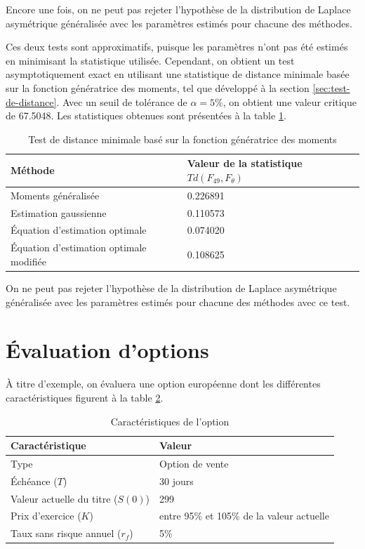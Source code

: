 Encore une fois, on ne peut pas rejeter l'hypothèse de la distribution
de Laplace asymétrique généralisée avec les paramètres estimés pour
chacune des méthodes.

Ces deux tests sont approximatifs, puisque les paramètres n'ont pas
été estimés en minimisant la statistique utilisée. Cependant, on
obtient un test asymptotiquement exact en utilisant une statistique de
distance minimale basée sur la fonction génératrice des moments, tel
que développé à la section \ref{sec:test-de-distance}. Avec un seuil
de tolérance de $\alpha=5\%$, on obtient une valeur critique de
67.5048. Les statistiques obtenues sont présentées à la table
\ref{tab:testDMR1}.

\begin{table}[!ht]
  \centering
  \begin{tabular}{ll}
    \hline
    \textbf{Méthode} & \textbf{Valeur de la statistique $Td(F_{49},F_{\theta})$} \\
    \hline
    Moments généralisée & 0.226891 \\
    Estimation gaussienne & 0.110573  \\
    Équation d'estimation optimale & 0.074020 \\
    Équation d'estimation optimale modifiée & 0.108625 \\
    \hline
  \end{tabular}
  \caption{Test de distance minimale basé sur la fonction génératrice des moments}
  \label{tab:testDMR1}
\end{table}

On ne peut pas rejeter l'hypothèse de la distribution de Laplace
asymétrique généralisée avec les paramètres estimés pour chacune des
méthodes avec ce test.

\section{Évaluation d'options}
\label{sec:evaluation-doptions}

À titre d'exemple, on évaluera une option européenne dont les
différentes caractéristiques figurent à la table
\ref{tab:caracteristiqueoptionR1}.

\begin{table}[!ht]
  \centering
  \begin{tabular}{ll}
    \hline
    \textbf{Caractéristique} & \textbf{Valeur} \\
    \hline
    Type & Option de vente \\
    Échéance ($T$) & 30 jours \\
    Valeur actuelle du titre ($S(0)$) & 299 \\
    Prix d'exercice ($K$) & entre 95\% et 105\% de la valeur actuelle \\
    Taux sans risque annuel ($r_f$) & 5\% \\
    \hline
  \end{tabular}
  \caption{Caractéristiques de l'option}
  \label{tab:caracteristiqueoptionR1}
\end{table}

